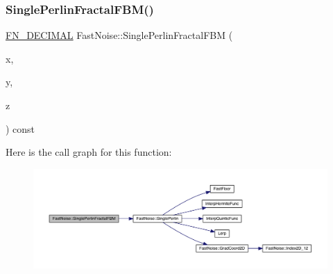 \subsubsection{\texorpdfstring{Single\+Perlin\+Fractal\+F\+B\+M()}{SinglePerlinFractalFBM()}\hspace{0.1cm}{\footnotesize\ttfamily [2/2]}}
{\footnotesize\ttfamily \mbox{\hyperlink{_fast_noise_8h_a75a9ef6d2541c4921815b885bfd449c3}{F\+N\+\_\+\+D\+E\+C\+I\+M\+AL}} Fast\+Noise\+::\+Single\+Perlin\+Fractal\+F\+BM (\begin{DoxyParamCaption}\item[{\mbox{\hyperlink{_fast_noise_8h_a75a9ef6d2541c4921815b885bfd449c3}{F\+N\+\_\+\+D\+E\+C\+I\+M\+AL}}}]{x,  }\item[{\mbox{\hyperlink{_fast_noise_8h_a75a9ef6d2541c4921815b885bfd449c3}{F\+N\+\_\+\+D\+E\+C\+I\+M\+AL}}}]{y,  }\item[{\mbox{\hyperlink{_fast_noise_8h_a75a9ef6d2541c4921815b885bfd449c3}{F\+N\+\_\+\+D\+E\+C\+I\+M\+AL}}}]{z }\end{DoxyParamCaption}) const\hspace{0.3cm}{\ttfamily [private]}}

Here is the call graph for this function\+:
\nopagebreak
\begin{figure}[H]
\begin{center}
\leavevmode
\includegraphics[width=350pt]{class_fast_noise_ab2189c13cfabb4e900c6e63d74962ce2_cgraph}
\end{center}
\end{figure}
\mbox{\label{class_fast_noise_a20d9ce6e0bd7730ac242e7de5fda0541}} 
